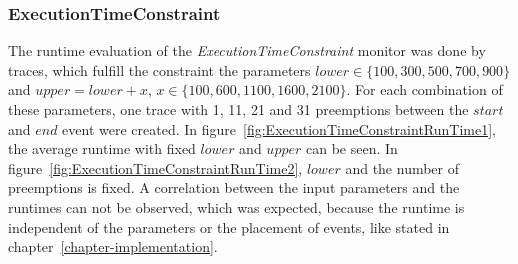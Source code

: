 \subsubsection{ExecutionTimeConstraint}
	The runtime evaluation of the \textit{ExecutionTimeConstraint} monitor was done by traces, which fulfill the constraint the parameters $lower\in\{100,300,500,700,900\}$ and $upper=lower+x$, $x\in\{100,600,1100,1600,2100\}$. For each combination of these parameters, one trace with 1, 11, 21 and 31 preemptions between the $start$ and $end$ event were created. In figure~\ref{fig:ExecutionTimeConstraintRunTime1}, the average runtime with fixed $lower$ and $upper$ can be seen. In figure~\ref{fig:ExecutionTimeConstraintRunTime2}, $lower$ and the number of preemptions is fixed. A correlation between the input parameters and the runtimes can not be observed, which was expected, because the runtime is independent of the parameters or the placement of events, like stated in chapter~\ref{chapter-implementation}.
